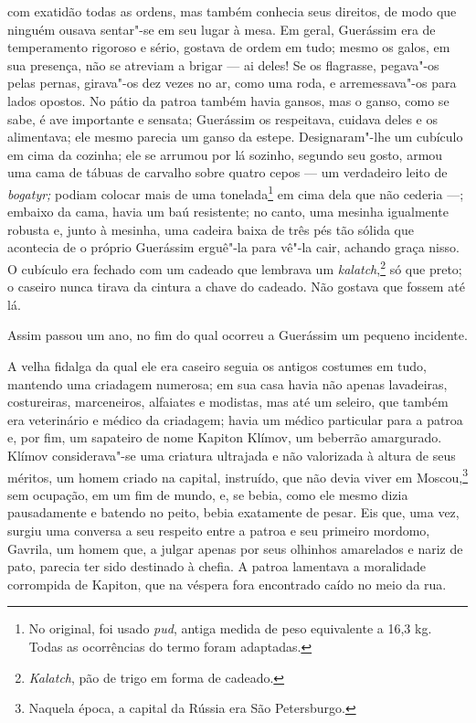 com exatidão todas as ordens, mas também conhecia seus direitos, de modo
que ninguém ousava sentar"-se em seu lugar à mesa. Em geral, Guerássim
era de temperamento rigoroso e sério, gostava de ordem em tudo; mesmo os
galos, em sua presença, não se atreviam a brigar --- ai deles! Se os
flagrasse, pegava"-os pelas pernas, girava"-os dez vezes no ar, como uma
roda, e arremessava"-os para lados opostos. No pátio da patroa também
havia gansos, mas o ganso, como se sabe, é ave importante e sensata;
Guerássim os respeitava, cuidava deles e os alimentava; ele mesmo
parecia um ganso da estepe. Designaram"-lhe um cubículo em cima da
cozinha; ele se arrumou por lá sozinho, segundo seu gosto, armou uma
cama de tábuas de carvalho sobre quatro cepos --- um verdadeiro leito de
\emph{bogatyr;} podiam colocar mais de uma tonelada\footnote{No
  original, foi usado \emph{pud}, antiga medida de peso equivalente a
  16,3 kg. Todas as ocorrências do termo foram adaptadas.} em cima dela
que não cederia ---; embaixo da cama, havia um baú resistente; no canto,
uma mesinha igualmente robusta e, junto à mesinha, uma cadeira baixa de
três pés tão sólida que acontecia de o próprio Guerássim erguê"-la para
vê"-la cair, achando graça nisso. O cubículo era fechado com um cadeado
que lembrava um \emph{kalatch},\footnote{\emph{Kalatch}, pão de trigo
  em forma de cadeado.} só que preto; o caseiro nunca tirava da
cintura a chave do cadeado. Não gostava que fossem até lá.

Assim passou um ano, no fim do qual ocorreu a Guerássim um pequeno
incidente.

A velha fidalga da qual ele era caseiro seguia os antigos costumes em
tudo, mantendo uma criadagem numerosa; em sua casa havia não apenas
lavadeiras, costureiras, marceneiros, alfaiates e modistas, mas até um
seleiro, que também era veterinário e médico da criadagem; havia um
médico particular para a patroa e, por fim, um sapateiro de nome Kapiton
Klímov, um beberrão amargurado. Klímov considerava"-se uma criatura
ultrajada e não valorizada à altura de seus méritos, um homem criado na
capital, instruído, que não devia viver em Moscou,\footnote{Naquela
  época, a capital da Rússia era São Petersburgo.} sem ocupação, em um
fim de mundo, e, se bebia, como ele mesmo dizia pausadamente e batendo
no peito, bebia exatamente de pesar. Eis que, uma vez, surgiu uma
conversa a seu respeito entre a patroa e seu primeiro mordomo, Gavrila,
um homem que, a julgar apenas por seus olhinhos amarelados e nariz de
pato, parecia ter sido destinado à chefia. A patroa lamentava a
moralidade corrompida de Kapiton, que na véspera fora encontrado caído
no meio da rua.

